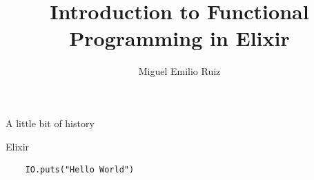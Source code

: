 \documentclass[aspectratio=169]{beamer}
\title[Elixir]{Introduction to Functional Programming in Elixir}
\author{Miguel Emilio Ruiz}
\begin{document}
\frame{\titlepage}

\begin{frame}{A little bit of history}
\end{frame}

\begin{frame}[fragile]{Elixir}
  \begin{verbatim}
    IO.puts("Hello World")
  \end{verbatim}
\end{frame}
\end{document}
